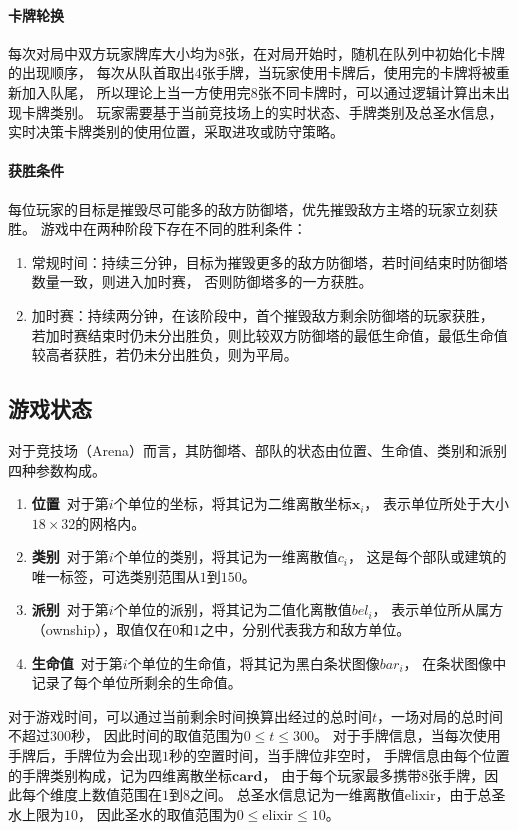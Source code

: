 \documentclass[openany,twoside,nofonts,AutoFakeBold,UTF8]{ctexbook}
\def\bd{\boldsymbol}        %
\begin{document}
\paragraph{卡牌轮换}
每次对局中双方玩家牌库大小均为8张，在对局开始时，随机在队列中初始化卡牌的出现顺序，
每次从队首取出4张手牌，当玩家使用卡牌后，使用完的卡牌将被重新加入队尾，
所以理论上当一方使用完8张不同卡牌时，可以通过逻辑计算出未出现卡牌类别。
玩家需要基于当前竞技场上的实时状态、手牌类别及总圣水信息，
实时决策卡牌类别的使用位置，采取进攻或防守策略。
\paragraph{获胜条件}\label{win-condition}
每位玩家的目标是摧毁尽可能多的敌方防御塔，优先摧毁敌方主塔的玩家立刻获胜。
游戏中在两种阶段下存在不同的胜利条件：
\begin{enumerate}
  \item 常规时间：持续三分钟，目标为摧毁更多的敌方防御塔，若时间结束时防御塔数量一致，则进入加时赛，
  否则防御塔多的一方获胜。
  \item 加时赛：持续两分钟，在该阶段中，首个摧毁敌方剩余防御塔的玩家获胜，
  若加时赛结束时仍未分出胜负，则比较双方防御塔的最低生命值，最低生命值较高者获胜，若仍未分出胜负，则为平局。
\end{enumerate}
\subsection{游戏状态}\label{sec-game-state}
对于竞技场（Arena）而言，其防御塔、部队的状态由位置、生命值、类别和派别四种参数构成。
\begin{enumerate}
  \item \textbf{位置}~对于第$i$个单位的坐标，将其记为二维离散坐标$\bd{x}_i$，
  表示单位所处于大小$18\times 32$的网格内。
  \item \textbf{类别}~对于第$i$个单位的类别，将其记为一维离散值$c_{i}$，
  这是每个部队或建筑的唯一标签，可选类别范围从$1$到$150$。
  \item \textbf{派别}~对于第$i$个单位的派别，将其记为二值化离散值$bel_{i}$，
  表示单位所从属方（ownship），取值仅在$0$和$1$之中，分别代表我方和敌方单位。
  \item \textbf{生命值}~对于第$i$个单位的生命值，将其记为黑白条状图像$bar_i$，
  在条状图像中记录了每个单位所剩余的生命值。
\end{enumerate}
对于游戏时间，可以通过当前剩余时间换算出经过的总时间$t$，一场对局的总时间不超过$300$秒，
因此时间的取值范围为$0\leqslant t\leqslant 300$。
对于手牌信息，当每次使用手牌后，手牌位为会出现$1$秒的空置时间，当手牌位非空时，
手牌信息由每个位置的手牌类别构成，记为四维离散坐标$\bd{\text{card}}$，
由于每个玩家最多携带$8$张手牌，因此每个维度上数值范围在$1$到$8$之间。
总圣水信息记为一维离散值$\text{elixir}$，由于总圣水上限为$10$，
因此圣水的取值范围为$0\leqslant \text{elixir}\leqslant 10$。
\end{document}
